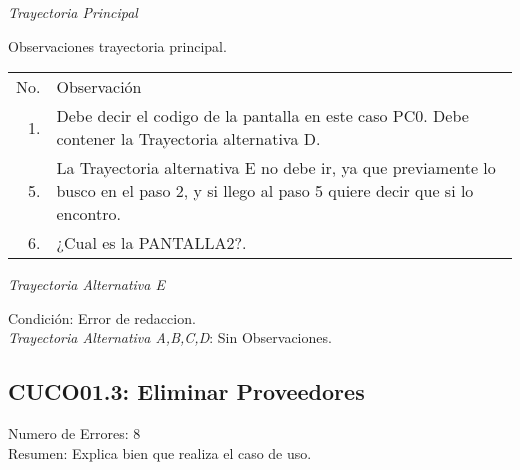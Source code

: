 \documentclass[10pt,spanish]{article}
\providecommand{\tabularnewline}{\\}
\begin{document}


\textit{\large Trayectoria Principal}{\large {} }{\large \par}

Observaciones trayectoria principal. %
\begin{longtable}{rp{8cm}}
No.  & Observación\tabularnewline
1. & Debe decir el codigo de la pantalla en este caso PC0. Debe contener la Trayectoria alternativa D.\tabularnewline
5. & La Trayectoria alternativa E no debe ir, ya que previamente lo busco en el paso 2, y si llego al paso 5 quiere decir que si lo encontro. \tabularnewline
6. & ¿Cual es la PANTALLA2?.\tabularnewline
\end{longtable}

\textit{Trayectoria Alternativa E}

Condición: Error de redaccion.\tabularnewline

\textit{Trayectoria Alternativa A,B,C,D}: Sin Observaciones. 

\newpage{}


\subsection{CUCO01.3: Eliminar Proveedores}
Numero de Errores: 8\tabularnewline
Resumen: Explica bien que realiza el caso de uso.
\end{document}
